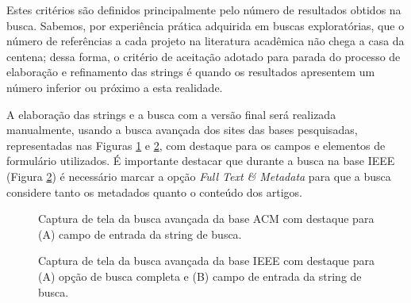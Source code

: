 Estes critérios são definidos principalmente pelo
número de resultados obtidos na busca.
Sabemos, por experiência prática adquirida em buscas exploratórias, 
que o número de referências a cada projeto na
literatura acadêmica não chega a casa da centena; dessa forma, o critério de
aceitação adotado para parada do processo de elaboração e refinamento das strings é
quando os resultados apresentem um número inferior ou próximo a esta realidade.

A elaboração das strings e a busca com a versão final será
realizada manualmente, usando a busca avançada dos sites das bases pesquisadas,
representadas nas Figuras \ref{advanced-search-acm} e
\ref{advanced-search-ieee}, com destaque para os campos e elementos de formulário
utilizados. É importante destacar que durante a busca na
base IEEE (Figura \ref{advanced-search-ieee}) é necessário marcar a opção {\it Full Text \& Metadata} para que a
busca considere tanto os metadados quanto o conteúdo dos artigos.

\begin{figure}[h]
  \center
  \caption{Captura de tela da busca avançada da base ACM com destaque para (A) campo de entrada da string de busca.}
  \label{advanced-search-acm}
\end{figure}

\begin{figure}[h]
  \center
  \caption{Captura de tela da busca avançada da base IEEE com destaque para (A) opção de busca completa e (B) campo de entrada da string de busca.}
  \label{advanced-search-ieee}
\end{figure}

